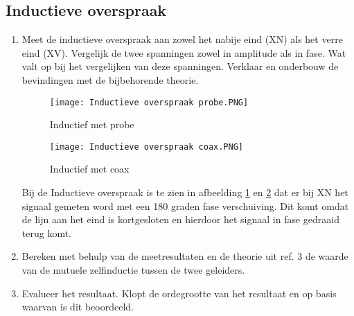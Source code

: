 \subsection{Inductieve overspraak}
\begin{enumerate}
    \item Meet de inductieve overspraak aan zowel het nabije eind (XN) als het verre eind (XV). Vergelijk de twee spanningen zowel in amplitude als in fase. Wat valt op bij het vergelijken
    van deze spanningen. Verklaar en onderbouw de bevindingen met de bijbehorende theorie.

    \begin{figure}[H]
        \centering
        \texttt{[image: Inductieve overspraak probe.PNG]}
        \caption{Inductief met probe}
        \label{fig:Inductief met probe}
    \end{figure}

    \begin{figure}[H]
        \centering
        \texttt{[image: Inductieve overspraak coax.PNG]}
        \caption{Inductief met coax}
        \label{fig:Inductief met coax}
    \end{figure}

    Bij de Inductieve overspraak is te zien in afbeelding \ref{fig:Inductief met probe} en \ref{fig:Inductief met coax} dat er bij XN het signaal gemeten word met een 180 graden fase verschuiving. Dit komt omdat de lijn aan het eind is kortgesloten en hierdoor het signaal in fase gedraaid terug komt.
    
    \item Bereken met behulp van de meetresultaten en de theorie uit ref. 3 de waarde van de
    mutuele zelfinductie tussen de twee geleiders.

    \item Evalueer het resultaat. Klopt de ordegrootte van het resultaat en op basis waarvan is dit
    beoordeeld.

\end{enumerate}


